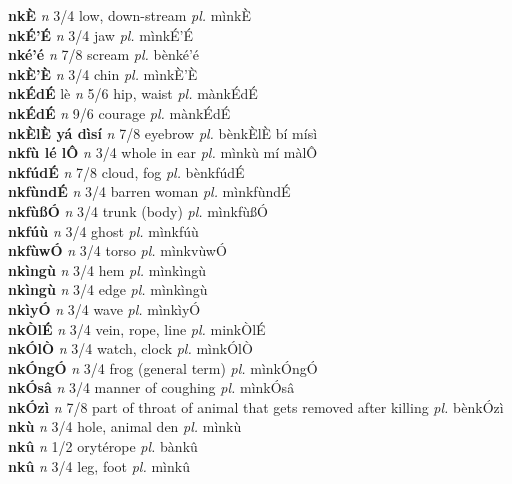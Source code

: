 \documentclass{article}
\begin{document}
{\bf nkÈ}  {\it n} 3/4 low, down-stream {\it pl.} mìnkÈ         \\ 
{\bf nkÉ'É}  {\it n} 3/4 jaw {\it pl.} mìnkÉ'É         \\ 
{\bf nké'é}  {\it n} 7/8 scream {\it pl.} bènké'é         \\ 
{\bf nkÈ'È}  {\it n} 3/4 chin {\it pl.} mìnkÈ'È         \\ 
{\bf nkÉdÉ} lè {\it n} 5/6 hip, waist {\it pl.} mànkÉdÉ         \\ 
{\bf nkÉdÉ}  {\it n} 9/6 courage {\it pl.} mànkÉdÉ         \\ 
{\bf nkÈlÈ yá dìsí}  {\it n} 7/8 eyebrow {\it pl.} bènkÈlÈ bí mísì         \\ 
{\bf nkfù lé lÔ}  {\it n} 3/4 whole in ear {\it pl.} mìnkù mí màlÔ         \\ 
{\bf nkfúdÉ}  {\it n} 7/8 cloud, fog {\it pl.} bènkfúdÉ         \\ 
{\bf nkfùndÉ}  {\it n} 3/4 barren woman {\it pl.} mìnkfùndÉ         \\ 
{\bf nkfùßÓ}  {\it n} 3/4 trunk (body) {\it pl.} mìnkfùßÓ         \\ 
{\bf nkfúù}  {\it n} 3/4 ghost {\it pl.} mìnkfúù         \\ 
{\bf nkfùwÓ}  {\it n} 3/4 torso  {\it pl.} mìnkvùwÓ         \\ 
{\bf nkìngù}  {\it n} 3/4 hem {\it pl.} mìnkìngù         \\ 
{\bf nkìngù}  {\it n} 3/4 edge {\it pl.} mìnkìngù         \\ 
{\bf nkìyÓ}  {\it n} 3/4 wave {\it pl.} mìnkìyÓ         \\ 
{\bf nkÒlÉ}  {\it n} 3/4 vein, rope, line {\it pl.} minkÒlÉ         \\ 
{\bf nkÓlÒ}  {\it n} 3/4 watch, clock {\it pl.} mìnkÓlÒ         \\ 
{\bf nkÓngÓ}  {\it n} 3/4 frog (general term) {\it pl.} mìnkÓngÓ         \\ 
{\bf nkÓsâ}  {\it n} 3/4 manner of coughing {\it pl.} mìnkÓsâ         \\ 
{\bf nkÓzì}  {\it n} 7/8 part of throat of animal that gets removed after killing {\it pl.} bènkÓzì         \\ 
{\bf nkù}  {\it n} 3/4 hole, animal den {\it pl.} mìnkù         \\ 
{\bf nkû}  {\it n} 1/2 orytérope {\it pl.} bànkû         \\ 
{\bf nkû}  {\it n} 3/4 leg, foot {\it pl.} mìnkû         \\ 
\end{document}
